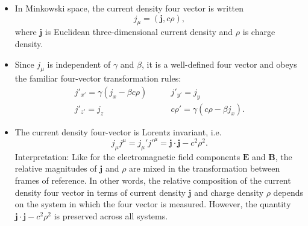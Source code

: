\documentclass[11pt, a4paper]{article}
\renewcommand{\vec}[1]{\bm{#1}} %
\newcommand{\E}{\vec{E}} %
\newcommand{\B}{\vec{B}} %
\renewcommand{\j}{\vec{j}}  %
\begin{document}
\begin{itemize}
    \item In Minkowski space, the current density four vector is written
    \begin{equation*}
        j_{\mu} = (\j, c \rho),
    \end{equation*}
    where $ \j $ is Euclidean three-dimensional current density and $ \rho $ is charge density.

	\item Since $ j_{\mu} $ is independent of $ \gamma $ and $ \beta $, it is a well-defined four vector and obeys the familiar four-vector transformation rules:
	\begin{equation*}
        \begin{array}{ll}
            j'_{x'} = \gamma (j_{x} - \beta c \rho) & \qquad j'_{y'} = j_{y}\\
            j'_{z'} = j_{z} &  \qquad c \rho' = \gamma(c \rho - \beta j_{x}).
        \end{array}
	\end{equation*}
	
    \item The current density four-vector is Lorentz invariant, i.e. 
	\begin{equation*}
		j_{\mu}j^{\mu} = j_{\mu}'j'^{\mu} = \j \cdot \j - c^{2}\rho^{2}.
	\end{equation*}
    Interpretation: Like for the electromagnetic field components $ \E $ and $ \B $, the relative magnitudes of $ \j $ and $ \rho $ are mixed in the transformation between frames of reference. In other words, the relative composition of the current density four vector in terms of current density $ \j $ and charge density $ \rho $ depends on the system in which the four vector is measured. However, the quantity $ \j \cdot \j - c^{2}\rho^{2} $ is preserved across all systems.

\end{itemize}
\end{document}

